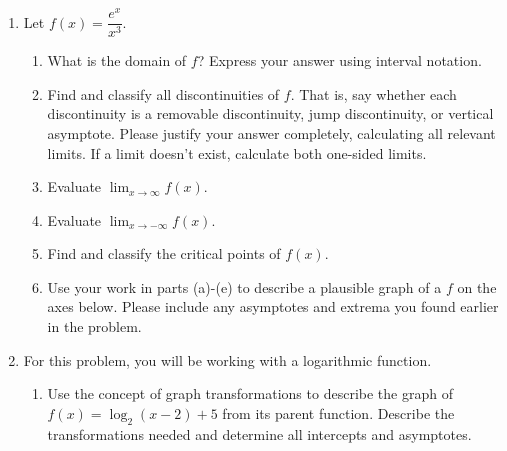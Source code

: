 \documentclass{article}
\begin{document}
\begin{enumerate}
    \item Let $f(x)=\dfrac{e^x}{x^3}$.
    \begin{enumerate}
        \item \begin{problem}What is the domain of $f$? Express your answer using interval notation.
        \end{problem}
        \vspace{1in}
        \item \begin{problem}[\vfill]Find and classify all discontinuities of $f$. That is, say whether each discontinuity is a removable discontinuity, jump discontinuity, or vertical asymptote. Please justify your answer completely, calculating all relevant limits. If a limit doesn’t exist, calculate both one-sided limits.
        \end{problem}
        \item \begin{problem}Evaluate $\displaystyle\lim_{x\to \infty}f(x)$. 
        \vspace{1in}
        \end{problem}
        \newpage
        \item \begin{problem}Evaluate $\displaystyle\lim_{x\to -\infty}f(x)$. 
        \end{problem}
        \vspace{1in}
        \item \begin{problem}[\vfill]Find and classify the critical points of $f(x)$.
        \end{problem}
        \item Use your work in parts (a)-(e) to describe a plausible graph of a $f$ on the axes below. Please include any asymptotes and extrema you found earlier in the problem.\\

    \end{enumerate} 
\newpage
 
\item For this problem, you will be working with a logarithmic function. 

    \begin{enumerate}
        \item Use the concept of graph transformations to describe the graph of $f(x)=\log_2(x-2)+5$ from its parent function. Describe the transformations needed and determine all intercepts and asymptotes.\\
        \begin{center}
            

\end{center}
\end{enumerate}
\end{enumerate}
\end{document}
